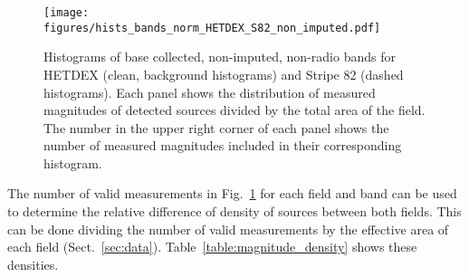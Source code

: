 \documentclass{aa}
\begin{document}
\begin{appendix}
\begin{figure}
   \centering
   \texttt{[image: figures/hists\_bands\_norm\_HETDEX\_S82\_non\_imputed.pdf]}
   \caption{Histograms of base collected, non-imputed, non-radio bands for HETDEX (clean, background histograms) and Stripe 82 (dashed histograms). Each panel shows the distribution of measured magnitudes of detected sources divided by the total area of the field. The number in the upper right corner of each panel shows the number of measured magnitudes included in their corresponding histogram.}
   \label{fig:hists_bands_nonimp_HETDEX_S82}
\end{figure}

The number of valid measurements in Fig.~\ref{fig:hists_bands_nonimp_HETDEX_S82} for each field and band can be used to determine the relative difference of density of sources between both fields. This can be done dividing the number of valid measurements by the effective area of each field (Sect.~\ref{sec:data}). Table~\ref{table:magnitude_density} shows these densities.


\end{appendix}
\end{document}
